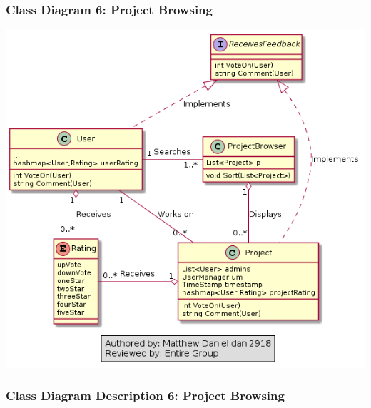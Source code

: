\documentclass[twoside,letterpaper]{article}
\begin{document}
{\subsubsection[Class Diagram 6: Project Browsing]{\rmfamily\bfseries\color{black}
	Class Diagram 6: Project Browsing}
\hypertarget{RefHeading22059017292}{}
\bigskip

\includegraphics[width=\textwidth]{images/ClassDiagrams/ProjectBrowsing}

\newpage

\subsubsection[Class Diagram Description 6: Project Browsing]{\rmfamily\bfseries\color{black}
	Class Diagram Description 6: Project Browsing}
\hypertarget{RefHeading22059017292}{}


}
\end{document}

